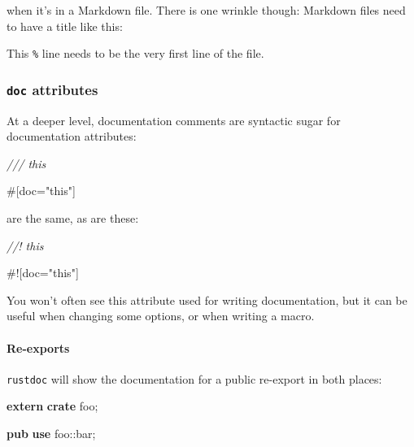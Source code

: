 \documentclass[a4paper,]{book}
\newenvironment{Shaded}{\begin{snugshade}}{\end{snugshade}}
\newcommand{\KeywordTok}[1]{\textcolor[rgb]{0.13,0.29,0.53}{\textbf{{#1}}}}
\newcommand{\StringTok}[1]{\textcolor[rgb]{0.31,0.60,0.02}{{#1}}}
\newcommand{\CommentTok}[1]{\textcolor[rgb]{0.56,0.35,0.01}{\textit{{#1}}}}
\newcommand{\AttributeTok}[1]{\textcolor[rgb]{0.77,0.63,0.00}{{#1}}}
\newcommand{\NormalTok}[1]{{#1}}
\let\oldparagraph\paragraph
\renewcommand{\paragraph}[1]{\oldparagraph{#1}\mbox{}}
\begin{document}
when it's in a Markdown file. There is one wrinkle though: Markdown
files need to have a title like this:

\begin{Shaded}
\end{Shaded}

This \texttt{\%} line needs to be the very first line of the file.

\subsubsection{\texorpdfstring{\texttt{doc}
attributes}{doc attributes}}\label{doc-attributes}

At a deeper level, documentation comments are syntactic sugar for
documentation attributes:

\begin{Shaded}
\begin{Highlighting}[]
\CommentTok{/// this}

\AttributeTok{#[}\NormalTok{doc}\AttributeTok{=}\StringTok{"this"}\AttributeTok{]}
\end{Highlighting}
\end{Shaded}

are the same, as are these:

\begin{Shaded}
\begin{Highlighting}[]
\CommentTok{//! this}

\AttributeTok{#![}\NormalTok{doc}\AttributeTok{=}\StringTok{"this"}\AttributeTok{]}
\end{Highlighting}
\end{Shaded}

You won't often see this attribute used for writing documentation, but
it can be useful when changing some options, or when writing a macro.

\paragraph{Re-exports}\label{re-exports}

\texttt{rustdoc} will show the documentation for a public re-export in
both places:

\begin{Shaded}
\begin{Highlighting}[]
\KeywordTok{extern} \KeywordTok{crate} \NormalTok{foo;}

\KeywordTok{pub} \KeywordTok{use} \NormalTok{foo::bar;}
\end{Highlighting}
\end{Shaded}
\end{document}
